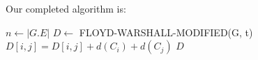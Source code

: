 \documentclass[12pt,letterpaper]{article}
\begin{document}
\begin{enumerate}
      Our completed algorithm is:

      \begin{algorithm}
        \begin{algorithmic}
            \State $n \gets |G.E|$
            \State $D \gets$ FLOYD-WARSHALL-MODIFIED(G, t)
                  \State $D[i, j] = D[i, j] + d(C_i) + d(C_j)$
                \EndIf
              \EndFor
            \EndFor
          \State \Return $D$
          \EndFunction
        \end{algorithmic}
      \end{algorithm}
  \end{enumerate}
\end{document}
